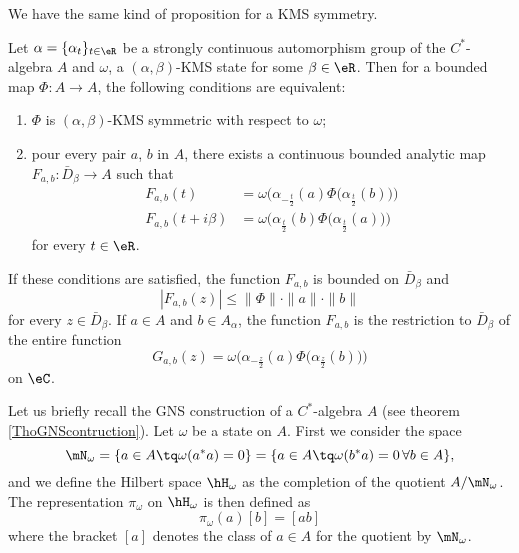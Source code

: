 We have the same kind of proposition for a KMS symmetry.

\begin{proposition}		\label{PropFabcomegaKSM}
	Let $\alpha=\{ \alpha_t \}_{t\in\eR}$ be a strongly continuous automorphism group of the $C^*$-algebra $A$ and $\omega$, a $(\alpha,\beta)$-KMS state for some $\beta\in\eR$. Then for a bounded map $\Phi\colon A\to A$, the following conditions are equivalent:
	\begin{enumerate}
		\item
			$\Phi$ is $(\alpha,\beta)$-KMS symmetric with respect to $\omega$;
		\item
			pour every pair $a$, $b$ in $A$, there exists a continuous bounded analytic map $F_{a,b}\colon \bar D_{\beta}\to A$ such that
			\begin{subequations}
				\begin{align}
					F_{a,b}(t)&=\omega\Big( \alpha_{-\frac{ t }{2}}(a)\Phi\big( \alpha_{\frac{ t }{ 2 }}(b) \big) \Big)\\
					F_{a,b}(t+i\beta)&=\omega\Big( \alpha_{\frac{ t }{2}}(b)\Phi\big( \alpha_{\frac{ t }{ 2 }}(a) \big) \Big)	\label{subEqFabitbhi}
				\end{align}
			\end{subequations}
			for every $t\in\eR$.
	\end{enumerate}
	If these conditions are satisfied, the function $F_{a,b}$ is bounded on $\bar D_{\beta}$ and
	\begin{equation}
		| F_{a,b}(z) |\leq\| \Phi \|\cdot\| a \|\cdot\| b \|
	\end{equation}
	for every $z\in\bar D_{\beta}$. If $a\in A$ and $b\in A_{\alpha}$, the function $F_{a,b}$ is the restriction to $\bar D_{\beta}$ of the entire function
	\begin{equation}
		G_{a,b}(z)=\omega\Big( \alpha_{-\frac{ z }{2}}(a)\Phi\big( \alpha_{\frac{ z }{2}}(b) \big) \Big)
	\end{equation}
	on $\eC$.
\end{proposition}

Let us briefly recall the GNS construction of a $C^*$-algebra $A$ (see theorem \ref{ThoGNScontruction}). Let $\omega$ be a state on $A$. First we consider the space
\begin{equation}
	\mN_{\omega}=\{ a\in A\tq\omega(a^*a)=0 \}=\{ a\in A\tq \omega(b^*a)=0\,\forall b\in A \},
\end{equation}
and we define the Hilbert space $\hH_{\omega}$ as the completion of the quotient $A/\mN_{\omega}$. The representation $\pi_{\omega}$ on $\hH_{\omega}$ is then defined as
\begin{equation}
	\pi_{\omega}(a)[b]=[ab]
\end{equation}
where the bracket $[a]$ denotes the class of $a\in A$ for the quotient by $\mN_{\omega}$.

